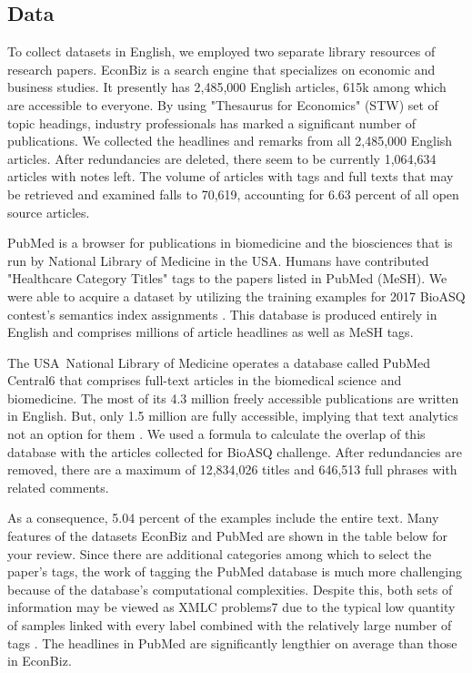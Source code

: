 \documentclass[a4paper]{article}
\begin{document}
\subsection{Data}
To collect datasets in English, we employed two separate library resources of research papers. EconBiz is a search engine that specializes on economic and business studies. It presently has 2,485,000 English articles, 615k among which are accessible to everyone. By using "Thesaurus for Economics" (STW) set of topic headings, industry professionals has marked a significant number of publications. We collected the headlines and remarks from all 2,485,000 English articles. After redundancies are deleted, there seem to be currently 1,064,634 articles with notes left. The volume of articles with tags and full texts that may be retrieved and examined falls to 70,619, accounting for 6.63 percent of all open source articles.

PubMed is a browser for publications in biomedicine and the biosciences that is run by National Library of Medicine in the USA. Humans have contributed "Healthcare Category Titles" tags to the papers listed in PubMed (MeSH). We were able to acquire a dataset by utilizing the training examples for 2017 BioASQ contest's semantics index assignments \cite{johnson2014effective}. This database is produced entirely in English and comprises millions of article headlines as well as MeSH tags.

The USA National Library of Medicine operates a database called PubMed Central6 that comprises full-text articles in the biomedical science and biomedicine. The most of its 4.3 million freely accessible publications are written in English. But, only 1.5 million are fully accessible, implying that text analytics not an option for them \cite{bhowmick2009multi}. We used a formula to calculate the overlap of this database with the articles collected for BioASQ challenge. After redundancies are removed, there are a maximum of 12,834,026 titles and 646,513 full phrases with related comments.

As a consequence, 5.04 percent of the examples include the entire text. Many features of the datasets EconBiz and PubMed are shown in the table below for your review. Since there are additional categories among which to select the paper's tags, the work of tagging the PubMed database is much more challenging because of the database's computational complexities. Despite this, both sets of information may be viewed as XMLC problems7 due to the typical low quantity of samples linked with every label combined with the relatively large number of tags \cite{schulz2015rapid} \cite{DBLP:journals/pr/MadjarovKGD12}. The headlines in PubMed are significantly lengthier on average than those in EconBiz.
\end{document}
